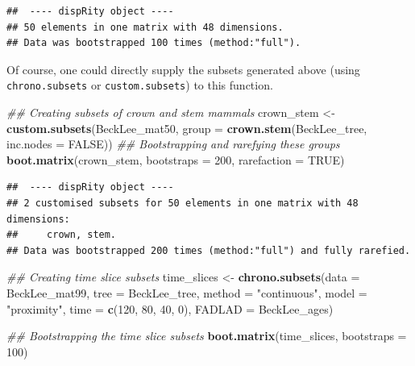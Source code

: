 \documentclass[]{book}
\newenvironment{Shaded}{\begin{snugshade}}{\end{snugshade}}
\newcommand{\CommentTok}[1]{\textcolor[rgb]{0.56,0.35,0.01}{\textit{#1}}}
\newcommand{\DataTypeTok}[1]{\textcolor[rgb]{0.13,0.29,0.53}{#1}}
\newcommand{\DecValTok}[1]{\textcolor[rgb]{0.00,0.00,0.81}{#1}}
\newcommand{\KeywordTok}[1]{\textcolor[rgb]{0.13,0.29,0.53}{\textbf{#1}}}
\newcommand{\NormalTok}[1]{#1}
\newcommand{\OtherTok}[1]{\textcolor[rgb]{0.56,0.35,0.01}{#1}}
\newcommand{\StringTok}[1]{\textcolor[rgb]{0.31,0.60,0.02}{#1}}
\begin{document}
\begin{verbatim}
##  ---- dispRity object ---- 
## 50 elements in one matrix with 48 dimensions.
## Data was bootstrapped 100 times (method:"full").
\end{verbatim}

Of course, one could directly supply the subsets generated above (using \texttt{chrono.subsets} or \texttt{custom.subsets}) to this function.

\begin{Shaded}
\begin{Highlighting}[]
\CommentTok{## Creating subsets of crown and stem mammals}
\NormalTok{crown_stem <-}\StringTok{ }\KeywordTok{custom.subsets}\NormalTok{(BeckLee_mat50,}
                             \DataTypeTok{group =} \KeywordTok{crown.stem}\NormalTok{(BeckLee_tree,}
                                                \DataTypeTok{inc.nodes =} \OtherTok{FALSE}\NormalTok{))}
\CommentTok{## Bootstrapping and rarefying these groups}
\KeywordTok{boot.matrix}\NormalTok{(crown_stem, }\DataTypeTok{bootstraps =} \DecValTok{200}\NormalTok{, }\DataTypeTok{rarefaction =} \OtherTok{TRUE}\NormalTok{)}
\end{Highlighting}
\end{Shaded}

\begin{verbatim}
##  ---- dispRity object ---- 
## 2 customised subsets for 50 elements in one matrix with 48 dimensions:
##     crown, stem.
## Data was bootstrapped 200 times (method:"full") and fully rarefied.
\end{verbatim}

\begin{Shaded}
\begin{Highlighting}[]
\CommentTok{## Creating time slice subsets}
\NormalTok{time_slices <-}\StringTok{ }\KeywordTok{chrono.subsets}\NormalTok{(}\DataTypeTok{data =}\NormalTok{ BeckLee_mat99,}
                              \DataTypeTok{tree =}\NormalTok{ BeckLee_tree, }
                              \DataTypeTok{method =} \StringTok{"continuous"}\NormalTok{,}
                              \DataTypeTok{model =} \StringTok{"proximity"}\NormalTok{, }
                              \DataTypeTok{time =} \KeywordTok{c}\NormalTok{(}\DecValTok{120}\NormalTok{, }\DecValTok{80}\NormalTok{, }\DecValTok{40}\NormalTok{, }\DecValTok{0}\NormalTok{),}
                              \DataTypeTok{FADLAD =}\NormalTok{ BeckLee_ages)}

\CommentTok{## Bootstrapping the time slice subsets}
\KeywordTok{boot.matrix}\NormalTok{(time_slices, }\DataTypeTok{bootstraps =} \DecValTok{100}\NormalTok{)}
\end{Highlighting}
\end{Shaded}
\end{document}
